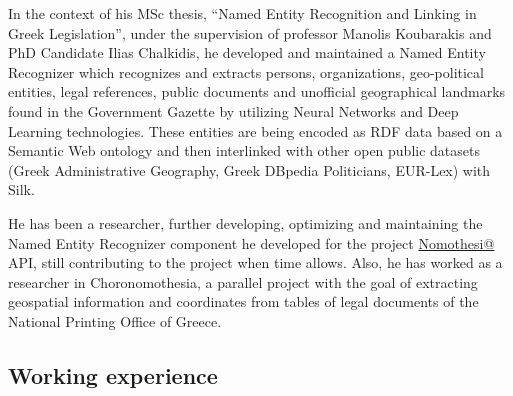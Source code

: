 \documentclass[a4paper,oneside,11pt]{article}
\begin{document}
\begin{sloppypar}
	In the context of his MSc thesis, ``Named Entity Recognition and Linking in Greek Legislation'',
	under the supervision of professor Manolis Koubarakis and PhD Candidate Ilias Chalkidis, he
	developed and maintained a Named Entity Recognizer which recognizes and extracts persons,
	organizations, geo-political entities, legal references, public documents and unofficial
	geographical landmarks found in the Government Gazette by utilizing Neural Networks and Deep Learning
	technologies. These entities are being encoded as RDF data based on a Semantic Web ontology and
	then interlinked with other open public datasets (Greek Administrative Geography, Greek
	DBpedia Politicians, EUR-Lex) with Silk.
\end{sloppypar}

\begin{sloppypar}
	He has been a researcher, further developing, optimizing and maintaining the Named Entity Recognizer
	component he developed for the project \href{http://legislation.di.uoa.gr}{Nomothesi@} API, still contributing to the project when time allows. Also, he has worked as a researcher in Choronomothesia, 
	a parallel project with the goal of extracting geospatial information and coordinates from tables of legal documents of the National Printing Office of Greece.
\end{sloppypar}

\subsection*{Working experience}
\end{document}

